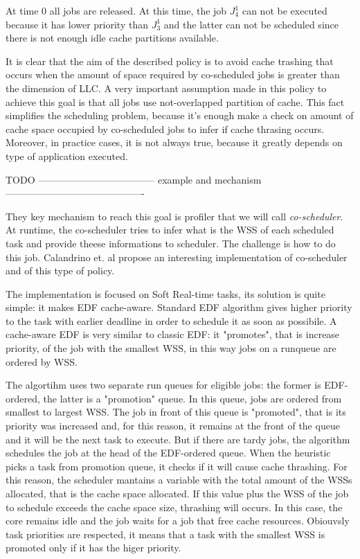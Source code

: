 At time 0 all jobs are released. At this time, the job $J_{4}^1$ can not be executed because it has lower priority than $J_{3}^1$ and the latter can not be
scheduled since there is not enough idle cache partitions available.

It is clear that the aim of the described policy is to avoid cache trashing that occurs when the amount of space required by co-scheduled jobs is greater 
than the dimension of LLC. A very important assumption made in this policy to achieve this goal is that all jobs use not-overlapped 
partition of cache. This fact simplifies the scheduling problem, because it's enough make a check on amount of cache space occupied by co-scheduled jobs to 
infer if cache thrasing occurs. Moreover, in practice cases, it is not always true, because it greatly depends on type of application executed.

TODO ------------------------------------ example and mechanism-------------------------------------------

They key mechanism to reach this goal is profiler that we will call \textit{co-scheduler}. At runtime, the co-scheduler tries to infer what is the WSS of 
each scheduled task and provide theese informations to scheduler. The challenge is how to do this job. Calandrino et. al propose an interesting
implementation of co-scheduler and of this type of policy.

The implementation is focused on Soft Real-time tasks, its solution is quite simple: it makes EDF cache-aware. Standard EDF algorithm gives higher priority 
to the task with earlier deadline in order to schedule it as soon as possibile. A cache-aware EDF is very similar to classic EDF: it "promotes", that is 
increase priority, of the job with the smallest WSS, in this way jobs on a runqueue are ordered by WSS.

The algortihm uses two separate run queues for eligible jobs: the former is EDF-ordered, the latter is a "promotion" queue. In this queue, jobs are ordered
from smallest to largest WSS. The job in front of this queue is "promoted", that is its priority was increased and, for this reason, it remains at the front
of the queue and it will be the next task to execute. But if there are tardy jobs, the algorithm schedules the job at the head of the EDF-ordered queue.
When the heuristic picks a task from promotion queue, it checks if it will cause cache thrashing. For this reason, the scheduler mantains a variable with 
the total amount of the WSSs allocated, that is the cache space allocated. If this value plus the WSS of the job to schedule exceeds the cache space size, 
thrashing will occurs. In this case, the core remains idle and the job waits for a job that free cache resources.
Obiouvsly task priorities are respected, it means that a task with the smallest WSS is promoted only if it has the higer priority.

